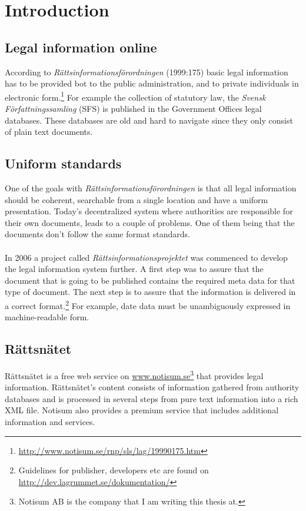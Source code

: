 \chapter{Introduction}
\section{Legal information online}

According to \textit{Rättsinformationsförordningen} (1999:175) basic legal information has to be provided bot to the public administration, and to private individuals in electronic form.\footnote{\url{http://www.notisum.se/rnp/sls/lag/19990175.htm}} For example the collection of statutory law, the \textit{Svensk Författningssamling} (SFS) is published in the Government Offices legal databases. These databases are old and hard to navigate since they only consist of plain text documents.\cite{regeringBib}

\section{Uniform standards}
One of the goals with \textit{Rättsinformationsförordningen} is that all legal information should be coherent, 
searchable from a single location and have a uniform presentation. Today’s decentralized system where 
authorities are responsible for their own documents, leads to a couple of problems. One of them being that 
the documents don’t follow the same format standards.\\\\ 
In 2006 a project called \textit{Rättsinformationsprojektet} was commenced to develop the legal information system further. 
A first step was to assure that the document that is going to be published contains the required meta data 
for that type of document. The next step is to assure that the information is delivered in a correct format.\footnote{Guidelines for publisher, developers etc are found on \url{http://dev.lagrummet.se/dokumentation/}} For example, date data must be unambiguously expressed in machine-readable form. 

\section{Rättsnätet} Rättsnätet is a free web service on
\url{www.notisum.se}\footnote{Notisum AB is the company that I am writing this thesis at.} that provides legal
information. Rättsnätet’s content consists of information gathered from
authority databases and is processed in several steps from pure text information
into a rich XML file. Notisum also provides a premium service that includes
additional information and services.

